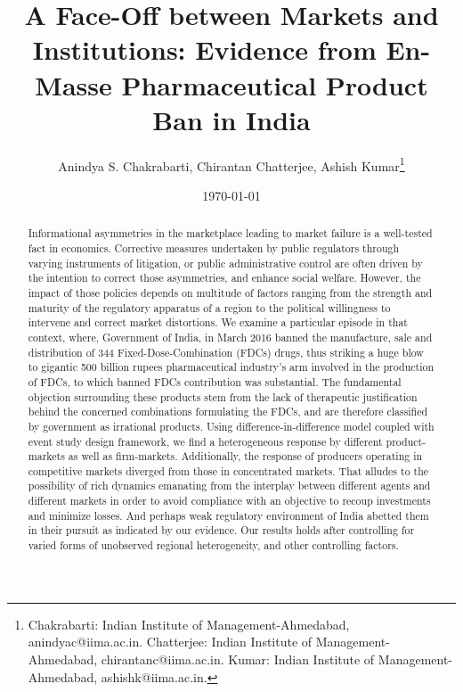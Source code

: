 \documentclass[AER]{AEA}
\theoremstyle{theorem}
\begin{document}
\title{ A Face-Off between Markets and Institutions: Evidence from  En-Masse Pharmaceutical Product Ban in India }
\shortTitle{}
\author{Anindya S. Chakrabarti, Chirantan Chatterjee, Ashish Kumar\thanks{Chakrabarti: Indian Institute of Management-Ahmedabad, anindyac@iima.ac.in. Chatterjee: Indian Institute of Management-Ahmedabad, chirantanc@iima.ac.in. Kumar: Indian Institute of Management-Ahmedabad, ashishk@iima.ac.in.}}
\date{\today}
\pubMonth{}
\pubYear{}
\pubVolume{}
\pubIssue{}
\JEL{}
\Keywords{}

\begin{abstract}
	Informational asymmetries in the marketplace leading to market failure is a well-tested fact in economics. Corrective measures undertaken by public regulators through varying instruments of litigation, or public administrative control are often driven by the intention to correct those asymmetries, and enhance social welfare. However, the impact of those policies depends on multitude of factors ranging from the strength and maturity of the regulatory apparatus of a region to the political willingness to intervene and correct market distortions. We examine a particular episode in that context, where, Government of India, in March 2016 banned the manufacture, sale and distribution of 344 Fixed-Dose-Combination (FDCs) drugs, thus striking a huge blow to gigantic 500 billion rupees pharmaceutical industry's arm involved in the production of FDCs, to which banned FDCs contribution was substantial. The fundamental objection  surrounding these products stem from the lack of therapeutic justification behind the concerned combinations formulating the FDCs, and are therefore classified by government as irrational products. Using difference-in-difference model coupled with event study design framework, we find a heterogeneous response by different product-markets as well as firm-markets. Additionally, the response of producers operating in competitive markets diverged from those in concentrated markets.
	That alludes to the possibility of rich dynamics emanating from the interplay between different agents and different  markets in order to avoid compliance with an objective to recoup investments and minimize losses. And perhaps weak regulatory environment of India abetted them in their pursuit as indicated by our evidence. Our results holds after controlling for varied forms of unobserved regional heterogeneity, and other controlling factors. 
\end{abstract}
\maketitle
\pagebreak
\end{document}
